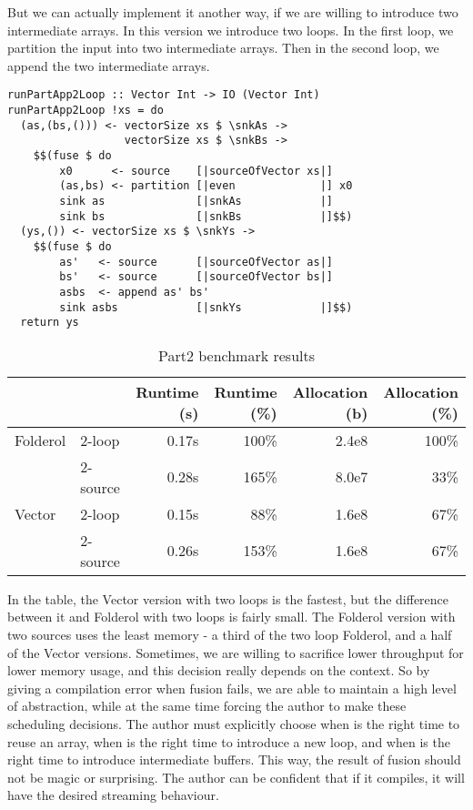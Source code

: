 But we can actually implement it another way, if we are willing to introduce two intermediate arrays.
In this version we introduce two loops.
In the first loop, we partition the input into two intermediate arrays.
Then in the second loop, we append the two intermediate arrays.

\begin{lstlisting}[float,label=l:bench:partitionAppend2Loop,caption=Partition / append with two loops]
runPartApp2Loop :: Vector Int -> IO (Vector Int)
runPartApp2Loop !xs = do
  (as,(bs,())) <- vectorSize xs $ \snkAs ->
                  vectorSize xs $ \snkBs ->
    $$(fuse $ do
        x0      <- source    [|sourceOfVector xs|]
        (as,bs) <- partition [|even             |] x0
        sink as              [|snkAs            |]
        sink bs              [|snkBs            |]$$)
  (ys,()) <- vectorSize xs $ \snkYs ->
    $$(fuse $ do
        as'   <- source      [|sourceOfVector as|]
        bs'   <- source      [|sourceOfVector bs|]
        asbs  <- append as' bs'
        sink asbs            [|snkYs            |]$$)
  return ys
\end{lstlisting}

\begin{table}
\begin{center}
\begin{tabular}{ll|rrrr}
& & Runtime (s)  & Runtime (\%) & Allocation (b) & Allocation (\%) \\
\hline
Folderol & 2-loop   & 0.17s &   100\% & 2.4e8 & 100\% \\
         & 2-source & 0.28s &   165\% & 8.0e7 &  33\% \\
Vector   & 2-loop   & 0.15s &    88\% & 1.6e8 &  67\% \\
         & 2-source & 0.26s &   153\% & 1.6e8 &  67\% \\
\end{tabular}
\end{center}
\caption[Part2 benchmark results]{Part2 benchmark results}
\label{table:bench:part2}
\end{table}


In the table, the Vector version with two loops is the fastest, but the difference between it and Folderol with two loops is fairly small.
The Folderol version with two sources uses the least memory - a third of the two loop Folderol, and a half of the Vector versions.
Sometimes, we are willing to sacrifice lower throughput for lower memory usage, and this decision really depends on the context.
So by giving a compilation error when fusion fails, we are able to maintain a high level of abstraction, while at the same time forcing the author to make these scheduling decisions.
The author must explicitly choose when is the right time to reuse an array, when is the right time to introduce a new loop, and when is the right time to introduce intermediate buffers.
This way, the result of fusion should not be magic or surprising.
The author can be confident that if it compiles, it will have the desired streaming behaviour.


